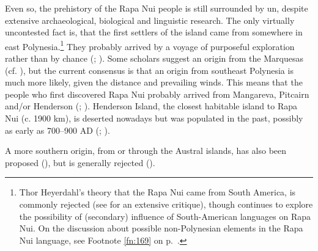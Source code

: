 Even so, the prehistory of the Rapa Nui people is still surrounded by un, despite extensive archaeological, biological and linguistic research. The only virtually uncontested fact is, that the first settlers of the island came from somewhere in east Polynesia.\footnote{\label{fn:5}Thor Heyerdahl’s theory that the Rapa Nui came from South America, is commonly rejected (see \citealt{BahnFlenley1992} for an extensive critique), though \citet{Schuhmacher1990} continues to explore the possibility of (secondary) influence of South-American languages on Rapa Nui. On the discussion about possible non-Polynesian elements in the Rapa Nui language, see Footnote \ref{fn:169} on p.~\pageref{fn:169}.} They probably arrived by a voyage of purposeful exploration rather than by chance (\citealt[72–79]{BahnFlenley1992}; \citealt[199]{KirchKahn2007}). Some scholars suggest an origin from the Marquesas (cf. \citealt[66]{BahnFlenley1992}), but the current consensus is that an origin from southeast Polynesia is much more likely, given the distance and prevailing winds. This means that the people who first discovered Rapa Nui probably arrived from Mangareva, Pitcairn and/or Henderson (\citealt{Green1998}; \citealt{StefanCollinsCuny2002}). Henderson Island, the closest habitable island to Rapa Nui (c. 1900 km), is deserted nowadays but was populated in the past, possibly as early as 700–900 AD (\citealt{Weisler1998}; \citealt{GreenWeisler2002}).

A more southern origin, from or through the Austral islands, has also been proposed (\citealt{LangdonTryon1983}), but is generally rejected (\citealt{Green1985,Green1998}).

